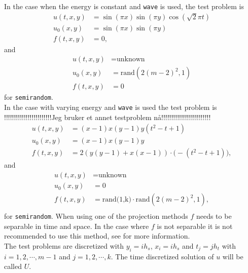 In the case when the energy is constant and \texttt{wave} is used, the test problem is 
\begin{equation}
\begin{aligned}
u(t,x,y) &= \sin(\pi x) \sin(\pi y) \cos(\sqrt{2} \pi t) \\
u_0(x,y) &= \sin( \pi x) \sin(\pi y) \\
f(t,x,y) &= 0 ,
\end{aligned}
\end{equation}
and 
\begin{equation}
\begin{aligned}
u(t,x,y) &= \text{unknown} \\
u_0(x,y) &= \text{rand} (2 (m-2)^2,1) \\
f(t,x,y) &= 0
\end{aligned}
\end{equation}
for \texttt{semirandom}.\\ %

In the case with varying energy and \texttt{wave} is used the test problem is 
!!!!!!!!!!!!!!!!!!!!!!!!Jeg bruker et annet testproblem nå!!!!!!!!!!!!!!!!!!!!!!!!!\\
\begin{equation}
\begin{aligned}
u(t,x,y) &= (x-1)x(y-1)y(t^2-t+1) \\
u_0(x,y) &= (x-1)x(y-1)y \\
f(t,x,y) &= 2 (y (y-1) + x (x-1)) \cdot \big( -(t^2-t+1) \big) ,
\end{aligned}
\end{equation}
and 
\begin{equation}
\begin{aligned}
u(t,x,y) &= \text{unknown} \\
u_0(x,y) &= 0 \\
f(t,x,y) &= \text{rand(1,k)} \cdot  \text{rand} (2 (m-2)^2,1), \\
\end{aligned}
\end{equation}
for \texttt{semirandom}. When using one of the projection methods $f$ needs to be separable in time and space. In the case where $f$ is not separable it is not recommended to use this method, see \cite{min} for more information.\\

The test problems are discretized with $y_i = i h_s$, $x_i = i h_s$ and $t_j = j h_t$ with $i = 1,2,\cdots,m-1 $ and $ j = 1,2,\cdots,k $. The time discretized solution of $u$ will be called $U$.


